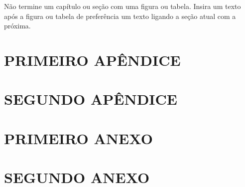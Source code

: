 \documentclass[
    12pt,				       %
    openright,			       %
    oneside,			       %
    a4paper,			       %
    chapter=TITLE,             %
    sumario=tradicional,       %
    english,			        %
    brazil, 				    %
 ]{abntex2}
\begin{document}
Não termine um capítulo ou seção com uma figura ou tabela. Insira um texto após a figura ou tabela de preferência um texto ligando a seção atual com a próxima.


\postextual



\thispagestyle{empty}




\begin{apendicesenv} \thispagestyle{empty}
    \partapendices %

    \chapter{\MakeUppercase{Primeiro Apêndice}} \thispagestyle{empty}

    \chapter{\MakeUppercase{Segundo Apêndice}} \thispagestyle{empty}
\end{apendicesenv}

\begin{anexosenv}
    \partanexos %

    \chapter{\MakeUppercase{Primeiro Anexo}} \thispagestyle{empty}

    \chapter{\MakeUppercase{Segundo Anexo}} \thispagestyle{empty}
\end{anexosenv}
\end{document}
